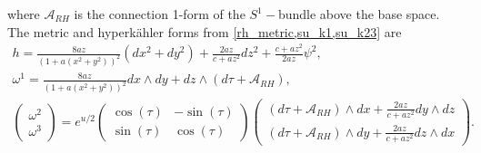 \documentclass[a4paper,12pt, onecolumn, notitlepage]{article}
\theoremstyle{definition}
\theoremstyle{remark}
\newcommand{\w}{\omega}
\newcommand{\HK}{hyperk\"ahler }
\begin{document}
where $\mathcal{A}_{RH}$ is the connection 1-form of the $S^{1}-$bundle above the base space. The metric and \HK forms from \cref{rh_metric,su_k1,su_k23} are
\begin{subequations}
	\begin{gather}
	\label{su_metric}
	h = \frac{8az}{(1+a(x^{2} + y^{2}))^{2}}(dx^{2}+dy^{2}) + \frac{2az}{c+az^{2}}dz^{2} +
	\frac{c+az^{2}}{2az}\psi^{2},\\
	\label{su_kahler1}
	\w^{1} = \frac{8az}{(1+a(x^{2} + y^{2}))^{2}}dx\wedge dy + dz \wedge (d\tau + \mathcal{A}_{RH}),\\
	\label{foldrh_k2k3}
	\begin{pmatrix}
	\w^{2}\\
	\w^{3}
	\end{pmatrix}
	=
	e^{u/2}
	\begin{pmatrix}
	\cos(\tau) & -\sin(\tau) \\
	\sin(\tau) & \cos(\tau)
	\end{pmatrix}
	\begin{pmatrix}
	(d\tau + \mathcal{A}_{RH})\wedge dx + \frac{2az}{c+az^{2}}dy\wedge dz\\
	(d\tau + \mathcal{A}_{RH})\wedge dy + \frac{2az}{c+az^{2}}dz\wedge dx
	\end{pmatrix}.
	\end{gather}
\end{subequations}
\end{document}
